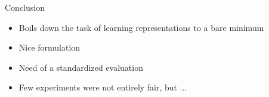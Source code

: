 \begin{frame}{Conclusion}
  \begin{itemize}
  \item Boils down the task of learning representations to a bare minimum
  \item Nice formulation
  \item Need of a standardized evaluation
  \item Few experiments were not entirely fair, but ...
  \end{itemize}
\end{frame}
